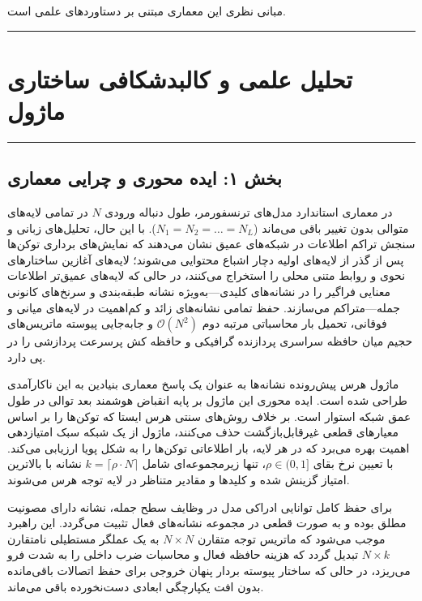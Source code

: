 \clearpage
{}
\vspace*{0.2cm}

مبانی نظری این معماری مبتنی بر دستاوردهای علمی \cite{kim2022learned} است.
\noindent\rule{\textwidth}{1.2pt}
\vspace*{0.1cm}
\section{تحلیل علمی و کالبدشکافی ساختاری ماژول }
\label{sec:mod_progressive_token_pruning}
\vspace*{-0.2cm}
\noindent\rule{\textwidth}{0.5pt}
\vspace*{0.3cm}

\subsection*{بخش ۱: ایده محوری و چرایی معماری }
در معماری استاندارد مدل‌های ترنسفورمر، طول دنباله ورودی $N$ در تمامی لایه‌های متوالی بدون تغییر باقی می‌ماند ($N_1 = N_2 = \dots = N_L$). با این حال، تحلیل‌های زبانی و سنجش تراکم اطلاعات در شبکه‌های عمیق نشان می‌دهند که نمایش‌های برداری توکن‌ها پس از گذر از لایه‌های اولیه دچار اشباع محتوایی می‌شوند؛ لایه‌های آغازین ساختارهای نحوی و روابط متنی محلی را استخراج می‌کنند، در حالی که لایه‌های عمیق‌تر اطلاعات معنایی فراگیر را در نشانه‌های کلیدی---به‌ویژه نشانه طبقه‌بندی \lr{[CLS]} و سرنخ‌های کانونی جمله---متراکم می‌سازند. حفظ تمامی نشانه‌های زائد و کم‌اهمیت در لایه‌های میانی و فوقانی، تحمیل بار محاسباتی مرتبه دوم $\mathcal{O}(N^2)$ و جابه‌جایی پیوسته ماتریس‌های حجیم میان حافظه سراسری پردازنده گرافیکی  و حافظه کش پرسرعت پردازشی  را در پی دارد.

ماژول هرس پیش‌رونده نشانه‌ها  به عنوان یک پاسخ معماری بنیادین به این ناکارآمدی طراحی شده است. ایده محوری این ماژول بر پایه انقباض هوشمند بعد توالی در طول عمق شبکه استوار است. بر خلاف روش‌های سنتی هرس ایستا که توکن‌ها را بر اساس معیارهای قطعی غیرقابل‌بازگشت حذف می‌کنند، ماژول  از یک شبکه سبک امتیازدهی اهمیت  بهره می‌برد که در هر لایه، بار اطلاعاتی توکن‌ها را به شکل پویا ارزیابی می‌کند. با تعیین نرخ بقای $\rho \in (0, 1]$، تنها زیرمجموعه‌ای شامل $k = \lceil \rho \cdot N \rceil$ نشانه با بالاترین امتیاز گزینش شده و کلیدها و مقادیر متناظر در لایه توجه هرس می‌شوند. 

برای حفظ کامل توانایی ادراکی مدل در وظایف سطح جمله، نشانه \lr{[CLS]} دارای مصونیت مطلق بوده و به صورت قطعی در مجموعه نشانه‌های فعال تثبیت می‌گردد. این راهبرد موجب می‌شود که ماتریس توجه متقارن $N \times N$ به یک عملگر مستطیلی نامتقارن $N \times k$ تبدیل گردد که هزینه حافظه فعال و محاسبات ضرب داخلی را به شدت فرو می‌ریزد، در حالی که ساختار پیوسته بردار پنهان خروجی برای حفظ اتصالات باقی‌مانده  بدون افت یکپارچگی ابعادی دست‌نخورده باقی می‌ماند.

